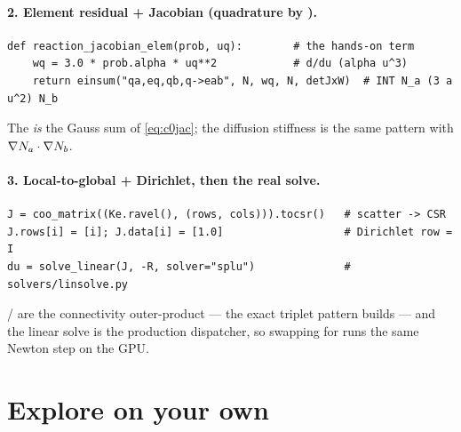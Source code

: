 \paragraph{2. Element residual + Jacobian (quadrature by ).}
\begin{lstlisting}
def reaction_jacobian_elem(prob, uq):        # the hands-on term
    wq = 3.0 * prob.alpha * uq**2            # d/du (alpha u^3)
    return einsum("qa,eq,qb,q->eab", N, wq, N, detJxW)  # INT N_a (3 a u^2) N_b
\end{lstlisting}
The  \emph{is} the Gauss sum of \eqref{eq:c0jac}; the diffusion
stiffness is the same pattern with $\nabla N_a\cdot\nabla N_b$.

\paragraph{3. Local-to-global + Dirichlet, then the real solve.}
\begin{lstlisting}
J = coo_matrix((Ke.ravel(), (rows, cols))).tocsr()   # scatter -> CSR
J.rows[i] = [i]; J.data[i] = [1.0]                   # Dirichlet row = I
du = solve_linear(J, -R, solver="splu")              # solvers/linsolve.py
\end{lstlisting}
/ are the connectivity outer-product --- the exact
triplet pattern  builds --- and the linear solve
is the production dispatcher, so swapping  for 
runs the same Newton step on the GPU.

\section{Explore on your own}




